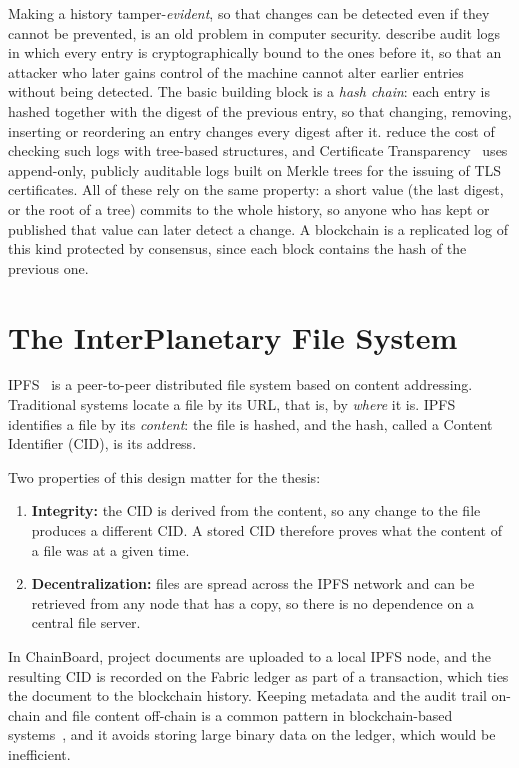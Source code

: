 Making a history tamper-\emph{evident}, so that changes can be detected even if they cannot be prevented, is an old problem in computer security. \textcite{schneier1999secure} describe audit logs in which every entry is cryptographically bound to the ones before it, so that an attacker who later gains control of the machine cannot alter earlier entries without being detected. The basic building block is a \emph{hash chain}: each entry is hashed together with the digest of the previous entry, so that changing, removing, inserting or reordering an entry changes every digest after it. \textcite{crosby2009tamper} reduce the cost of checking such logs with tree-based structures, and Certificate Transparency~\cite{rfc6962} uses append-only, publicly auditable logs built on Merkle trees for the issuing of TLS certificates. All of these rely on the same property: a short value (the last digest, or the root of a tree) commits to the whole history, so anyone who has kept or published that value can later detect a change. A blockchain is a replicated log of this kind protected by consensus, since each block contains the hash of the previous one.

\section{The InterPlanetary File System}
\label{sec:ipfs}

IPFS~\cite{benet2014ipfs} is a peer-to-peer distributed file system based on content addressing. Traditional systems locate a file by its URL, that is, by \emph{where} it is. IPFS identifies a file by its \emph{content}: the file is hashed, and the hash, called a Content Identifier (CID), is its address.

Two properties of this design matter for the thesis:

\begin{enumerate}
    \item \textbf{Integrity:} the CID is derived from the content, so any change to the file produces a different CID. A stored CID therefore proves what the content of a file was at a given time.
    \item \textbf{Decentralization:} files are spread across the IPFS network and can be retrieved from any node that has a copy, so there is no dependence on a central file server.
\end{enumerate}

In ChainBoard, project documents are uploaded to a local IPFS node, and the resulting CID is recorded on the Fabric ledger as part of a transaction, which ties the document to the blockchain history. Keeping metadata and the audit trail on-chain and file content off-chain is a common pattern in blockchain-based systems~\cite{adel2023}, and it avoids storing large binary data on the ledger, which would be inefficient.
